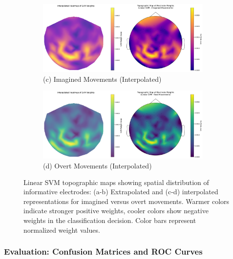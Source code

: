 \documentclass[
  letterpaper,
  DIV=11,
  numbers=noendperiod]{scrartcl}
\begin{document}
\begin{figure}
{\begin{figure}
\centering
\includegraphics[width=0.95\textwidth,height=\textheight]{figures/linearSVM/topomap_imagined_movements_interpolated_complete.png}
\caption{(c) Imagined Movements
(Interpolated)}\label{fig:topomap-imagined-interpolated}
\end{figure}

\begin{figure}
\centering
\includegraphics[width=0.95\textwidth,height=\textheight]{figures/linearSVM/topomap_real_movements_interpolated_complete_linearSVM.png}
\caption{(d) Overt Movements
(Interpolated)}\label{fig:topomap-overt-interpolated}
\end{figure}

}

\caption{\label{fig-topomap}Linear SVM topographic maps showing spatial
distribution of informative electrodes: (a-b) Extrapolated and (c-d)
interpolated representations for imagined versus overt movements. Warmer
colors indicate stronger positive weights, cooler colors show negative
weights in the classification decision. Color bars represent normalized
weight values.}

\end{figure}%

\subsubsection{Evaluation: Confusion Matrices and ROC
Curves}\label{evaluation-confusion-matrices-and-roc-curves}
\end{document}
